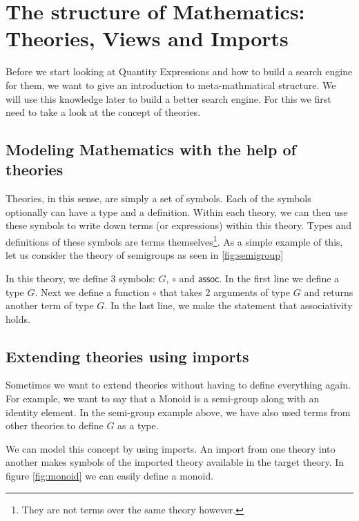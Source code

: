 \section{The structure of Mathematics: Theories, Views and Imports}
\label{sec:mathoverview}

Before we start looking at Quantity Expressions and how to build a search engine for them, we want to give an introduction to meta-mathmatical structure. We will use this knowledge later to build a better search engine. For this we first need to take a look at the concept of theories.

\subsection{Modeling Mathematics with the help of theories}

Theories, in this sense, are simply a set of symbols. Each of the symbols optionally can have a type and a definition. Within each theory, we can then use these symbols to write down terms (or expressions) within this theory. Types and definitions of these symbols are terms themselves\footnote{They are not terms over the same theory however. }. As a simple example of this, let us consider the theory of semigroups as seen in \ref{fig:semigroup}



In this theory, we define 3 symbols: $G$, $\circ$ and $\scriptstyle \mathsf{assoc}$. In the first line we define a type $G$. Next we define a function $\circ$ that takes 2 arguments of type $G$ and returns another term of type $G$. In the last line, we make the statement that associativity holds.

\subsection{Extending theories using imports}

Sometimes we want to extend theories without having to define everything again. For example, we want to say that a Monoid is a semi-group along with an identity element. In the semi-group example above, we have also used terms from other theories to define $G$ as a type.

We can model this concept by using imports. An import from one theory into another makes symbols of the imported theory available in the target theory. In figure \ref{fig:monoid} we can easily define a monoid.

